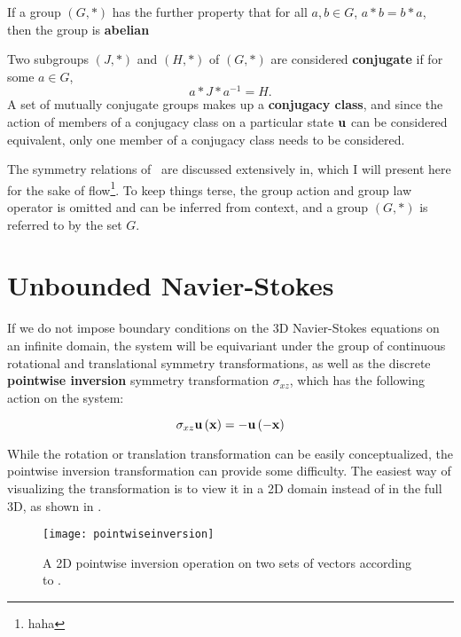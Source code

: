 \begin{define}
If a group $(G,\ast)$ has the further property that for all $a,b \in G$, $a \ast b = b \ast a$, then the group is {\bf abelian}
\end{define}
\begin{define}
Two subgroups $(J,\ast)$ and $(H,\ast)$ of $(G,\ast)$ are considered {\bf conjugate} if for some $a \in G$,
\begin{equation}
a\ast J \ast a^{-1} = H.
\end{equation} 
A set of mutually conjugate groups makes up a {\bf conjugacy class}, and since the action of members of a conjugacy class on a particular state $\mathbf{u}$ can be considered equivalent, only one member of a conjugacy class needs to be considered. 
\end{define}
The symmetry relations of \pCf\ are discussed extensively in, which I will present here for the sake of flow\footnote{haha}. To keep things terse, the group action and group law operator is omitted and can be inferred from context, and a group $(G,\ast)$ is referred to by the set $G$. 
\section{Unbounded Navier-Stokes}

If we do not impose boundary conditions on the 3D Navier-Stokes equations on an infinite domain, the system will be equivariant under the group of continuous rotational and translational symmetry transformations, as well as the discrete {\bf pointwise inversion} symmetry transformation $\sigma_{xz}$, which has the following action on the system:

\begin{equation}\label{eq:pointwiseinversion}
\sigma_{xz}\mathbf{u}\left ( \mathbf{x} \right ) = -\mathbf{u}\left ( -\mathbf{x} \right )
\end{equation}

While the rotation or translation transformation can be easily conceptualized, the pointwise inversion transformation can provide some difficulty. The easiest way of visualizing the transformation is to view it in a 2D domain instead of in the full 3D, as shown in . 

\begin{figure}[h]
\texttt{[image: pointwiseinversion]}
\caption{A 2D pointwise inversion operation on two sets of vectors according to .}\label{fig:pointwiseinversion}

\end{figure}


